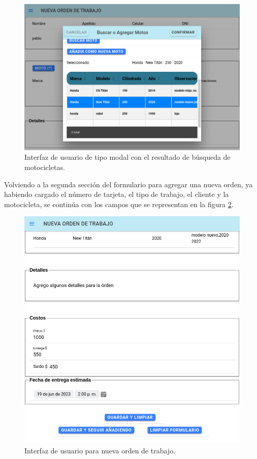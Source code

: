 \begin{figure}[H]
	\centering
	\includegraphics[scale=.35]{./Figures/nueva-moto-2.png}
	\caption{Interfaz de usuario de tipo modal con el resultado de búsqueda de motocicletas.}
	\label{fig:nuevamoto2}
\end{figure}

Volviendo a la segunda sección del formulario para agregar una nueva orden, ya habiendo cargado el número de tarjeta, el tipo de trabajo, el cliente y la motocicleta, se continúa con los campos que se representan en la figura \ref{fig:nuevafull2}.

 
\begin{figure}[H]
	\centering
	\includegraphics[scale=.35]{./Figures/nueva-full-2.png}
	\caption{Interfaz de usuario para nueva orden de trabajo.}
	\label{fig:nuevafull2}
\end{figure}

